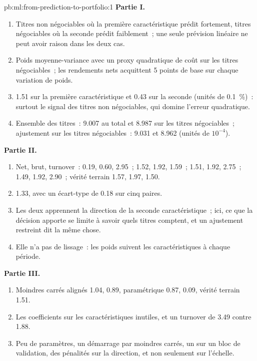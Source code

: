 \begin{solution}{pb:ml:from-prediction-to-portfolio:1}
\textbf{Partie I.}
\begin{enumerate}
\item Titres non négociables où la première caractéristique prédit fortement, titres négociables où la seconde prédit faiblement~; une
seule prévision linéaire ne peut avoir raison dans les deux cas.
\item Poids moyenne-variance avec un proxy quadratique de coût sur les titres négociables~; les rendements nets acquittent 5 points de base sur chaque variation
de poids.
\item 1.51 sur la première caractéristique et 0.43 sur la seconde (unités de 0.1~\%)~: surtout le signal des titres non négociables, qui domine
l'erreur quadratique.
\item Ensemble des titres~: 9.007 au total et 8.987 sur les titres négociables~; ajustement sur les titres négociables~: 9.031 et 8.962 (unités de $10^{-4}$).
\end{enumerate}
\textbf{Partie II.}
\begin{enumerate}[resume]
\item Net, brut, turnover~: 0.19, 0.60, 2.95~; 1.52, 1.92, 1.59~; 1.51, 1.92, 2.75~; 1.49, 1.92, 2.90~; vérité terrain 1.57, 1.97, 1.50.
\item 1.33, avec un écart-type de 0.18 sur cinq paires.
\item Les deux apprennent la direction de la seconde caractéristique~; ici, ce que la décision apporte se limite à savoir quels titres comptent, et un
ajustement restreint dit la même chose.
\item Elle n'a pas de lissage~: les poids suivent les caractéristiques à chaque période.
\end{enumerate}
\textbf{Partie III.}
\begin{enumerate}[resume]
\item Moindres carrés alignés 1.04,  0.89, paramétrique 0.87,  0.09, vérité terrain 1.51.
\item Les coefficients sur les caractéristiques inutiles, et un turnover de 3.49 contre 1.88.
\item Peu de paramètres, un démarrage par moindres carrés, un  sur un bloc de validation, des pénalités sur la direction, et non seulement
sur l'échelle.

\end{enumerate}
\end{solution}
